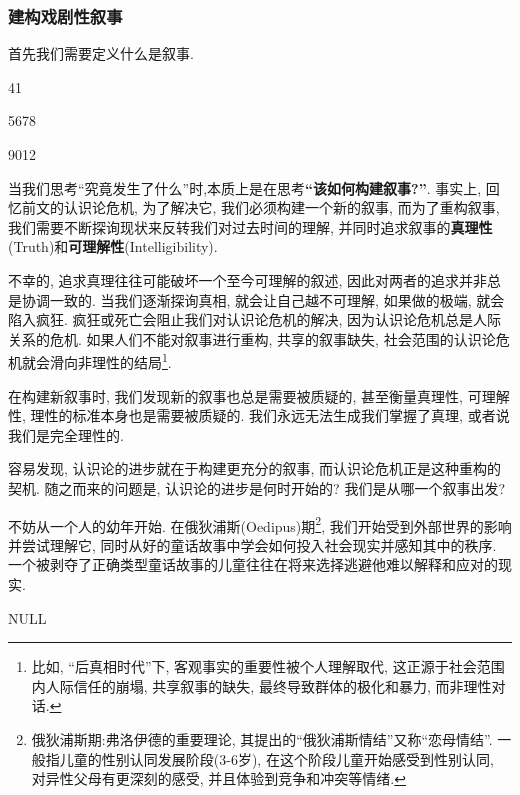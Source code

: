 \documentclass[12pt, a4paper, oneside]{ctexart}
\renewcommand{\b}{\textbf}
\newcommand{\f}{\footnote}
\newcommand{\q}[1]{\begin{questionbox}{}#1\end{questionbox}}
\newcommand{\ans}[1]{\begin{ansbox}{}#1\end{ansbox}}
\newcounter{question}[section]
\newcounter{ans}[section]
\begin{document}
\subsubsection{建构戏剧性叙事}

首先我们需要定义什么是叙事.

\q{41}
\q{5678}
\q{9012}
    

当我们思考``究竟发生了什么''时,本质上是在思考\b{``该如何构建叙事?''}. 事实上, 回忆前文的认识论危机, 为了解决它, 我们必须构建一个新的叙事, 而为了重构叙事, 我们需要不断探询现状来反转我们对过去时间的理解, 并同时追求叙事的\b{真理性}(Truth)和\b{可理解性}(Intelligibility).

不幸的, 追求真理往往可能破坏一个至今可理解的叙述, 因此对两者的追求并非总是协调一致的. 当我们逐渐探询真相, 就会让自己越不可理解, 如果做的极端, 就会陷入疯狂. 疯狂或死亡会阻止我们对认识论危机的解决, 因为认识论危机总是人际关系的危机. 如果人们不能对叙事进行重构, 共享的叙事缺失, 社会范围的认识论危机就会滑向非理性的结局\f{比如, ``后真相时代''下, 客观事实的重要性被个人理解取代, 这正源于社会范围内人际信任的崩塌, 共享叙事的缺失, 最终导致群体的极化和暴力, 而非理性对话. }. 

在构建新叙事时, 我们发现新的叙事也总是需要被质疑的, 甚至衡量真理性, 可理解性, 理性的标准本身也是需要被质疑的. 我们永远无法生成我们掌握了真理, 或者说我们是完全理性的.

容易发现, 认识论的进步就在于构建更充分的叙事, 而认识论危机正是这种重构的契机. 随之而来的问题是, 认识论的进步是何时开始的? 我们是从哪一个叙事出发?

不妨从一个人的幼年开始. 在俄狄浦斯(Oedipus)期\f{俄狄浦斯期:弗洛伊德的重要理论, 其提出的``俄狄浦斯情结''又称``恋母情结''. 一般指儿童的性别认同发展阶段(3-6岁), 在这个阶段儿童开始感受到性别认同, 对异性父母有更深刻的感受, 并且体验到竞争和冲突等情绪. }, 我们开始受到外部世界的影响并尝试理解它, 同时从好的童话故事中学会如何投入社会现实并感知其中的秩序. 一个被剥夺了正确类型童话故事的儿童往往在将来选择逃避他难以解释和应对的现实.



\q{}
\ans{NULL}

\end{document}
